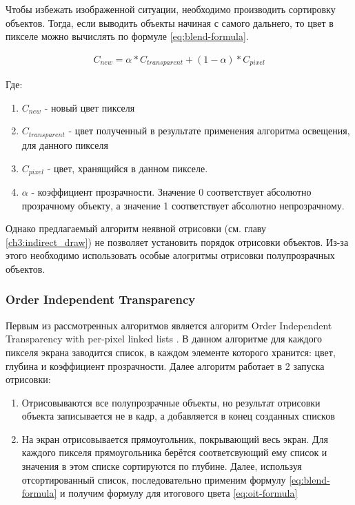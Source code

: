 		Чтобы избежать изображенной ситуации, необходимо производить сортировку объектов. Тогда, если выводить объекты начиная с самого дальнего, то цвет в пикселе можно вычислять по формуле \ref{eq:blend-formula}.
		
		\begin{equation}
			\label{eq:blend-formula}
			\begin{multlined}
				C_{new} = \alpha * C_{transparent} + (1 - \alpha) * C_{pixel}
			\end{multlined}
		\end{equation}
		
		Где:
		\begin{enumerate}[1.]
			\item $C_{new}$ - новый цвет пикселя
			\item $C_{transparent}$ - цвет полученный в результате применения алгоритма освещения, для данного пикселя
			\item $C_{pixel}$ - цвет, хранящийся в данном пикселе.
			\item $\alpha$ - коэффициент прозрачности. Значение 0 соответствует абсолютно прозрачному объекту, а значение 1 соответствует абсолютно непрозрачному.
		\end{enumerate}
		
		Однако предлагаемый алгоритм неявной отрисовки (см. главу \ref{ch3:indirect_draw}) не позволяет установить порядок отрисовки объектов. Из-за этого необходимо использовать особые алогритмы отрисовки полупрозрачных объектов.		
		
		\subsubsection{Order Independent Transparency} \label{ch3:render_pass:transparents:oit}
			Первым из рассмотренных алгоритмов является алгоритм Order Independent Transparency with per-pixel linked lists \cite{barta2011order}. В данном алгоритме для каждого пикселя экрана заводится список, в каждом элементе которого хранится: цвет, глубина и коэффициент прозрачности. Далее алгоритм работает в 2 запуска отрисовки:
			
			\begin{enumerate}[1.]
				\item Отрисовываются все полупрозрачные объекты, но результат отрисовки объекта записывается не в кадр, а добавляется в конец созданных списков
				\item На экран отрисовывается прямоугольник, покрывающий весь экран. Для каждого пикселя прямоугольника берётся соответсвующий ему список и значения в этом списке сортируются по глубине. Далее, используя отсортированный список, последовательно применим формулу \ref{eq:blend-formula} и получим формулу для итогового цвета \ref{eq:oit-formula}
			\end{enumerate}
			
